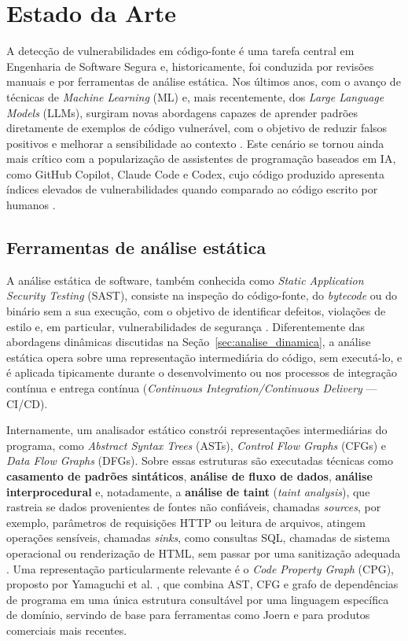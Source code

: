 \chapter{Estado da Arte}
\label{cap:estado_arte}

A detecção de vulnerabilidades em código-fonte é uma tarefa central em
Engenharia de Software Segura e, historicamente, foi conduzida por
revisões manuais e por ferramentas de análise estática. Nos últimos
anos, com o avanço de técnicas de \textit{Machine Learning} (ML) e, mais
recentemente, dos \textit{Large Language Models} (LLMs), surgiram novas
abordagens capazes de aprender padrões diretamente de exemplos de código
vulnerável, com o objetivo de reduzir falsos positivos e melhorar a
sensibilidade ao contexto \cite{chakraborty2021survey,li2022mlvulnerability,mdpi2026}.
Este cenário se tornou ainda mais crítico com a popularização de
assistentes de programação baseados em IA, como GitHub Copilot,
Claude Code e Codex, cujo código produzido apresenta índices
elevados de vulnerabilidades quando comparado ao código escrito por
humanos \cite{pearce2022copilot,veracode2025,wu2025}.

\section{Ferramentas de análise estática}
\label{sec:analise_estatica}

A análise estática de software, também conhecida como \textit{Static
Application Security Testing} (SAST), consiste na inspeção do código-fonte,
do \textit{bytecode} ou do binário sem a sua execução, com o objetivo de
identificar defeitos, violações de estilo e, em particular, vulnerabilidades
de segurança \cite{techscience2025}. Diferentemente das abordagens
dinâmicas discutidas na Seção~\ref{sec:analise_dinamica}, a análise
estática opera sobre uma representação intermediária do código, sem
executá-lo, e é aplicada tipicamente durante o desenvolvimento ou nos
processos de integração contínua e entrega contínua (\textit{Continuous
Integration/Continuous Delivery} — CI/CD).

Internamente, um analisador estático constrói representações
intermediárias do programa, como \textit{Abstract Syntax Trees} (ASTs),
\textit{Control Flow Graphs} (CFGs) e \textit{Data Flow Graphs} (DFGs).
Sobre essas estruturas são executadas técnicas como \textbf{casamento de
padrões sintáticos}, \textbf{análise de fluxo de dados},
\textbf{análise interprocedural} e, notadamente, a \textbf{análise de taint}
(\textit{taint analysis}), que rastreia se dados provenientes de fontes
não confiáveis, chamadas \textit{sources}, por exemplo, parâmetros de
requisições HTTP ou leitura de arquivos, atingem operações sensíveis,
chamadas \textit{sinks}, como consultas SQL, chamadas de sistema
operacional ou renderização de HTML, sem passar por uma sanitização
adequada \cite{yamaguchi2014cpg,safeguard2024}. Uma representação
particularmente relevante é o \textit{Code Property Graph} (CPG), proposto
por Yamaguchi et al. \cite{yamaguchi2014cpg}, que combina AST, CFG e
grafo de dependências de programa em uma única estrutura consultável por
uma linguagem específica de domínio, servindo de base para ferramentas
como Joern e para produtos comerciais mais recentes.

